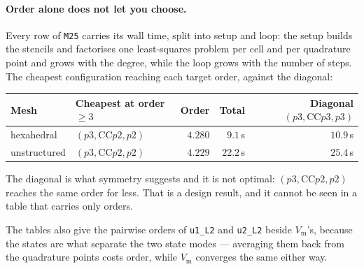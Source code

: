 \documentclass[11pt,a4paper]{article}
\newcommand{\code}[1]{\texttt{\small #1}}
\newcommand{\Vm}{V_{\text{m}}}
\begin{document}
\paragraph{Order alone does not let you choose.} Every row of \code{M25} carries
its wall time, split into setup and loop: the setup builds the stencils and
factorises one least-squares problem per cell and per quadrature point and grows
with the degree, while the loop grows with the number of steps. The cheapest
configuration reaching each target order, against the diagonal:
\begin{center}
\begin{tabular}{@{}llrrr@{}}
\toprule
Mesh & Cheapest at order $\geq 3$ & Order & Total & Diagonal $(p3,\mathrm{CC}p3,p3)$ \\
\midrule
hexahedral   & $(p3,\mathrm{CC}p2,p2)$ & $4.280$ & $9.1$\,s  & $10.9$\,s \\
unstructured & $(p3,\mathrm{CC}p2,p2)$ & $4.229$ & $22.2$\,s & $25.4$\,s \\
\bottomrule
\end{tabular}
\end{center}
The diagonal is what symmetry suggests and it is not optimal: $(p3,\mathrm{CC}p2,p2)$
reaches the same order for less. That is a design result, and it cannot be seen in
a table that carries only orders.

The tables also give the pairwise orders of \code{u1\_L2} and \code{u2\_L2} beside
$\Vm$'s, because the states are what separate the two state modes --- averaging
them back from the quadrature points costs order, while $\Vm$ converges the same
either way.
\end{document}

